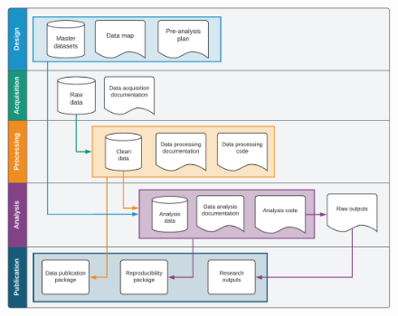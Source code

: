 \vspace{1cm}
\begin{fullwidth}
	\begin{figure}
		\centering
		\includegraphics[width=1.5\linewidth]{diagrams/Conclusion}
		\label{fig:conclusion}
	\end{figure}
\end{fullwidth}
